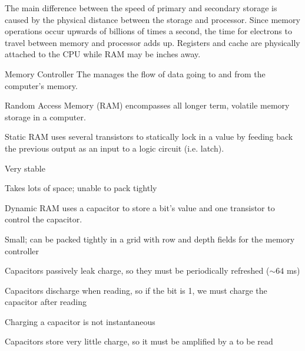 \documentclass[12pt]{report}
\begin{document}
The main difference between the speed of primary and secondary storage is caused by the physical distance between the storage and processor. Since memory operations occur upwards of billions of times a second, the time for electrons to travel between memory and processor adds up. Registers and cache are physically attached to the CPU while RAM may be inches away.

\begin{dfnbox}{Memory Controller}
	The  manages the flow of data going to and from the computer's memory.
\end{dfnbox}

\begin{dfnbox}{Random Access Memory (RAM)}
	 encompasses all longer term, volatile memory storage in a computer.
\end{dfnbox}

\begin{dfnbox}{Static RAM}
	 uses several transistors to statically lock in a value by feeding back the previous output as an input to a logic circuit (i.e. latch).
	
	\begin{dfnitems}
		\item Very stable
		\item Takes lots of space; unable to pack tightly
	\end{dfnitems}
\end{dfnbox}

\begin{dfnbox}{Dynamic RAM}
	 uses a capacitor to store a bit's value and one transistor to control the capacitor.

	\begin{dfnitems}
		\item Small; can be packed tightly in a grid with row and depth fields for the memory controller
	\end{dfnitems}

	\begin{dfnitems}
		\item Capacitors passively leak charge, so they must be periodically refreshed ($\sim64$ ms)
		\item Capacitors discharge when reading, so if the bit is 1, we must charge the capacitor after reading
		\item Charging a capacitor is not instantaneous
		\item Capacitors store very little charge, so it must be amplified by a  to be read
	\end{dfnitems}
\end{dfnbox}
\end{document}
